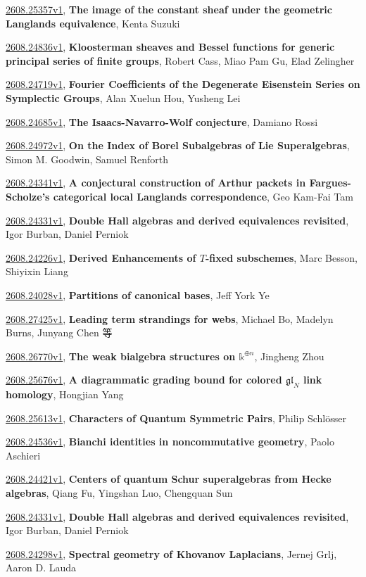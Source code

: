 \documentclass[9pt, a4paper]{article}
\theoremstyle{plain}
\theoremstyle{definition}
\theoremstyle{remark}
\newcommand{\arxiv}[3]{\href{https://arxiv.org/abs/#1}{#1}, \textbf{\textcolor{arxivblue}{#2}}, #3}
\begin{document}
\arxiv{2608.25357v1}{The image of the constant sheaf under the geometric Langlands equivalence}{Kenta Suzuki}

\arxiv{2608.24836v1}{Kloosterman sheaves and Bessel functions for generic principal series of finite groups}{Robert Cass, Miao Pam Gu, Elad Zelingher}

\arxiv{2608.24719v1}{Fourier Coefficients of the Degenerate Eisenstein Series on Symplectic Groups}{Alan Xuelun Hou, Yusheng Lei}

\arxiv{2608.24685v1}{The Isaacs-Navarro-Wolf conjecture}{Damiano Rossi}

\arxiv{2608.24972v1}{On the Index of Borel Subalgebras of Lie Superalgebras}{Simon M. Goodwin, Samuel Renforth}

\arxiv{2608.24341v1}{A conjectural construction of Arthur packets in Fargues-Scholze's categorical local Langlands correspondence}{Geo Kam-Fai Tam}

\arxiv{2608.24331v1}{Double Hall algebras and derived equivalences revisited}{Igor Burban, Daniel Perniok}

\arxiv{2608.24226v1}{Derived Enhancements of $T$-fixed subschemes}{Marc Besson, Shiyixin Liang}

\arxiv{2608.24028v1}{Partitions of canonical bases}{Jeff York Ye}

\arxiv{2608.27425v1}{Leading term strandings for webs}{Michael Bo, Madelyn Burns, Junyang Chen 等}

\arxiv{2608.26770v1}{The weak bialgebra structures on $\mathbb{k}^{\oplus n}$}{Jingheng Zhou}

\arxiv{2608.25676v1}{A diagrammatic grading bound for colored $\mathfrak{gl}_N$ link homology}{Hongjian Yang}

\arxiv{2608.25613v1}{Characters of Quantum Symmetric Pairs}{Philip Schlösser}

\arxiv{2608.24536v1}{Bianchi identities in noncommutative geometry}{Paolo Aschieri}

\arxiv{2608.24421v1}{Centers of quantum Schur superalgebras from Hecke algebras}{Qiang Fu, Yingshan Luo, Chengquan Sun}

\arxiv{2608.24331v1}{Double Hall algebras and derived equivalences revisited}{Igor Burban, Daniel Perniok}

\arxiv{2608.24298v1}{Spectral geometry of Khovanov Laplacians}{Jernej Grlj, Aaron D. Lauda}

\end{document}
